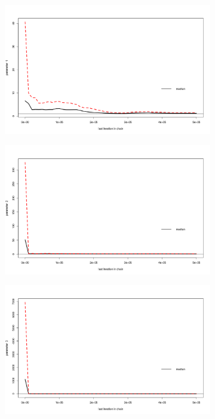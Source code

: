 \documentclass[paper=a4, fontsize=11pt]{scrartcl}
\numberwithin{equation}{section}		%
\numberwithin{figure}{section}			%
\numberwithin{table}{section}				%
\begin{document}
\begin{figure}[ht]
\begin{subfigure}{.5\textwidth}
\includegraphics[scale=0.2]{scale_red_par1.png}
\caption{}
\label{}
\end{subfigure}
\begin{subfigure}{.5\textwidth}
\includegraphics[scale=0.2]{scale_red_par2.png}
\caption{}
\label{}
\end{subfigure}
\begin{subfigure}{.5\textwidth}
\includegraphics[scale=0.2]{scale_red_par3.png}

\end{subfigure}
\end{figure}
\end{document}
